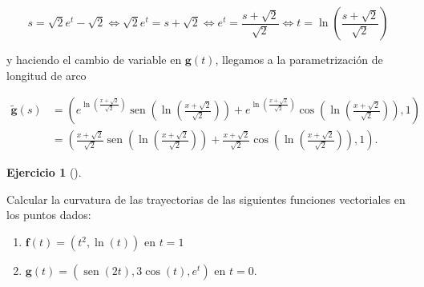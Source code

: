\documentclass[
  a4paper,
]{scrreport}
\theoremstyle{definition}
\newtheorem{exercise}{Ejercicio}[chapter]
\theoremstyle{remark}
\begin{document}
\begin{tcolorbox}
\begin{enumerate}
  \[
  s = \sqrt{2}e^t-\sqrt{2}
  \Leftrightarrow \sqrt{2}e^t = s+\sqrt{2}
  \Leftrightarrow e^t = \frac{s+\sqrt{2}}{\sqrt{2}}
  \Leftrightarrow t = \ln\left(\frac{s+\sqrt{2}}{\sqrt{2}}\right)
  \]

  y haciendo el cambio de variable en \(\mathbf{g}(t)\), llegamos a la
  parametrización de longitud de arco

  \begin{align*}
  \tilde{\mathbf{g}}(s) 
  &= \left(e^{\ln\left(\frac{x+\sqrt{2}}{\sqrt{2}}\right)}\operatorname{sen}\left(\ln\left(\frac{x+\sqrt{2}}{\sqrt{2}}\right)\right) + e^{\ln\left(\frac{x+\sqrt{2}}{\sqrt{2}}\right)}\cos\left(\ln\left(\frac{x+\sqrt{2}}{\sqrt{2}}\right)\right), 1 \right) \\
  &= \left(\frac{x+\sqrt{2}}{\sqrt{2}}\operatorname{sen}\left(\ln\left(\frac{x+\sqrt{2}}{\sqrt{2}}\right)\right) + \frac{x+\sqrt{2}}{\sqrt{2}}\cos\left(\ln\left(\frac{x+\sqrt{2}}{\sqrt{2}}\right)\right), 1 \right).
  \end{align*}
\end{enumerate}

\end{tcolorbox}

\begin{exercise}[]\protect\hypertarget{exr-curvatura-1}{}\label{exr-curvatura-1}

Calcular la curvatura de las trayectorias de las siguientes funciones
vectoriales en los puntos dados:

\begin{enumerate}
\def\labelenumi{\alph{enumi}.}
\item
  \(\mathbf{f}(t) = (t^2, \ln(t))\) en \(t=1\)
\item
  \(\mathbf{g}(t) = (\operatorname{sen}(2t), 3\cos(t), e^t)\) en
  \(t=0\).
\end{enumerate}

\end{exercise}
\end{document}
